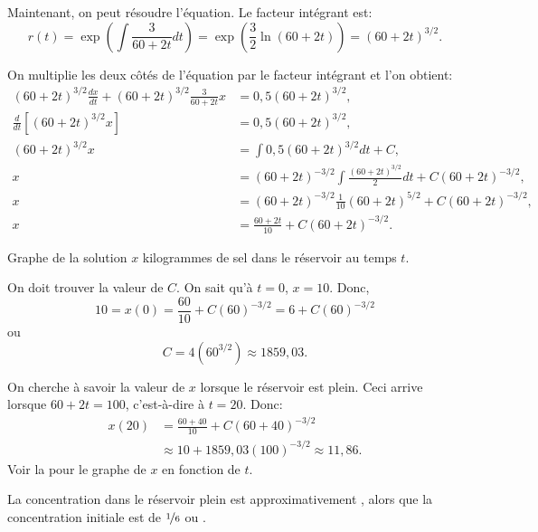 \begin{example}
	Maintenant, on peut résoudre l'équation.  Le facteur intégrant est:
	\begin{equation*}
		r(t) = \exp \left( \int \frac{3}{60+2t} dt  \right)
		= 	\exp \left( \frac{3}{2} \ln (60+2t) \right)
		= 	{(60+2t)}^{3/2} .
	\end{equation*}

	On multiplie les deux côtés de l'équation par le facteur intégrant et l'on obtient:
	\begin{align*}
	{(60+2t)}^{3/2} \frac{dx}{dt} + {(60+2t)}^{3/2} \frac{3}{60+2t} x
		& = 	0,5{(60+2t)}^{3/2}, \\
	\frac{d}{dt}\left[{(60+2t)}^{3/2} x \right]
		& = 0,5{(60+2t)}^{3/2}, \\
	{(60+2t)}^{3/2} x
		& = \int  0,5{(60+2t)}^{3/2} dt +C, \\
	 x	& = 	{(60+2t)}^{-3/2} \int  \frac{{(60+2t)}^{3/2}}{2}dt
					+C{(60+2t)}^{-3/2}, \\
	 x	& =	{(60+2t)}^{-3/2}\frac{1}{10}{(60+2t)}^{5/2}	+C{(60+2t)}^{-3/2}, \\
	 x	& = \frac{60+2t}{10}+C{(60+2t)}^{-3/2} .
	\end{align*}

	\begin{mywrapfig}{3.25in}
		\capstart{}
		\caption{Graphe de la solution $x$ kilogrammes de sel dans le réservoir au temps $t$.\label{linear-salt-graph:fig}}
	\end{mywrapfig}
	On doit trouver la valeur de $C$.  On sait qu'à $t=0$, $x=10$.
	Donc,
	\begin{equation*}
		10 = x(0) 	= 	\frac{60}{10}+C{(60)}^{-3/2} =6 +C{(60)}^{-3/2}
	\end{equation*}
	ou
	\begin{equation*}
		C=4 ({60}^{3/2}) \approx 1859{,}03 .
	\end{equation*}

	On cherche à savoir la valeur de $x$ lorsque le réservoir est plein.  Ceci arrive lorsque $60+2t = 100$, c'est-à-dire à  $t=20$.  Donc:
	\begin{equation*}
	\begin{split}
		x(20) & = 	\frac{60+40}{10}+C{(60+40)}^{-3/2}	\\
	 		& \approx	10 +1859,03 {(100)}^{-3/2} \approx 11,86 .
	\end{split}
	\end{equation*}
	Voir la  pour le graphe de $x$ en fonction de $t$.

	La concentration dans le réservoir plein est approximativement ,
	alors que la concentration initiale est de $\nicefrac{1}{6}$ ou .
\end{example}

